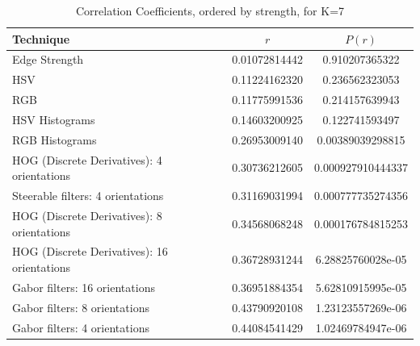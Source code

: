 \documentclass[conference,a4paper]{IEEEtran}
\begin{document}
\begin{table}[h]
\centering
\begin{tabular}{|p{3.5cm}|c|c|}
\hline
Technique     & $r$ & $P(r)$ \\ \hline
Edge Strength					& 0.01072814442	& 0.910207365322    \\
HSV						& 0.11224162320	& 0.236562323053    \\
RGB						& 0.11775991536	& 0.214157639943    \\
HSV Histograms					& 0.14603200925	& 0.122741593497    \\
RGB Histograms					& 0.26953009140	& 0.00389039298815  \\
HOG (Discrete Derivatives): 4 orientations	& 0.30736212605	& 0.000927910444337 \\
Steerable filters: 4 orientations		& 0.31169031994	& 0.000777735274356 \\
HOG (Discrete Derivatives): 8 orientations	& 0.34568068248	& 0.000176784815253 \\
HOG (Discrete Derivatives): 16 orientations	& 0.36728931244	& 6.28825760028e-05 \\
Gabor filters: 16 orientations			& 0.36951884354	& 5.62810915995e-05 \\
Gabor filters: 8 orientations			& 0.43790920108	& 1.23123557269e-06 \\
Gabor filters: 4 orientations			& 0.44084541429	& 1.02469784947e-06 \\
\hline
\end{tabular}
\vspace{0.5em}
\caption{Correlation Coefficients, ordered by strength, for K=7}\label{tab:results}
\end{table}


\end{document}
